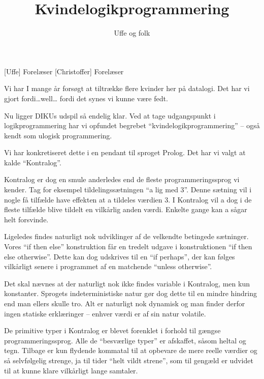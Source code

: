 \documentclass[danish]{article}
\title{Kvindelogikprogrammering}
\author{Uffe og folk}
\begin{document}
\maketitle

\begin{roles}
  [Uffe] Forelæser
  [Christoffer] Forelæser
\end{roles}

\begin{sketch}
  
 Vi har I mange år forsøgt at tiltrække flere kvinder her på datalogi.
Det har vi gjort fordi\ldots well\ldots {} fordi
det synes vi kunne være fedt.

 Nu ligger DIKUs udspil så endelig klar. Ved at tage udgangspunkt i
logikprogrammering har vi opfundet begrebet ``kvindelogikprogrammering'' -- også
kendt som ulogisk programmering.

 Vi har konkretiseret dette i en pendant til sproget Prolog. Det har vi
valgt at kalde ``Kontralog''.

 Kontralog er dog en smule anderledes end de fleste programmeringssprog
vi kender. Tag for eksempel tildelingssætningen ``a lig med 3''. Denne sætning
vil i nogle få tilfælde have effekten at a tildeles værdien 3. I Kontralog vil a
dog i de fleste tilfælde blive tildelt en vilkårlig anden værdi. Enkelte gange
kan a sågar helt forsvinde.

 Ligeledes findes naturligt nok udviklinger af de velkendte betingede
sætninger. Vores ``if then else'' konstruktion får en tredelt udgave i
konstruktionen ``if then else otherwise''. Dette kan dog udskrives til en ``if
perhaps'', der kan følges vilkårligt senere i programmet af en matchende
``unless otherwise''.

 Det skal nævnes at der naturligt nok ikke findes variable i Kontralog,
men kun konstanter. Sprogets indeterministiske natur gør dog dette til en mindre
hindring end man ellers skulle tro. Alt er naturligt nok dynamisk og man finder
derfor ingen statiske erklæringer -- enhver værdi er af sin natur volatile.

 De primitive typer i Kontralog er blevet forenklet i forhold til gængse
programmeringssprog. Alle de ``besværlige typer'' er afskaffet, såsom heltal og
tegn. Tilbage er kun flydende kommatal til at opbevare de mere reelle værdier og
så selvfølgelig strenge, ja til tider ``helt vildt strene'', som til gengæld er
udvidet til at kunne klare vilkårligt lange samtaler.


\end{sketch}
\end{document}
